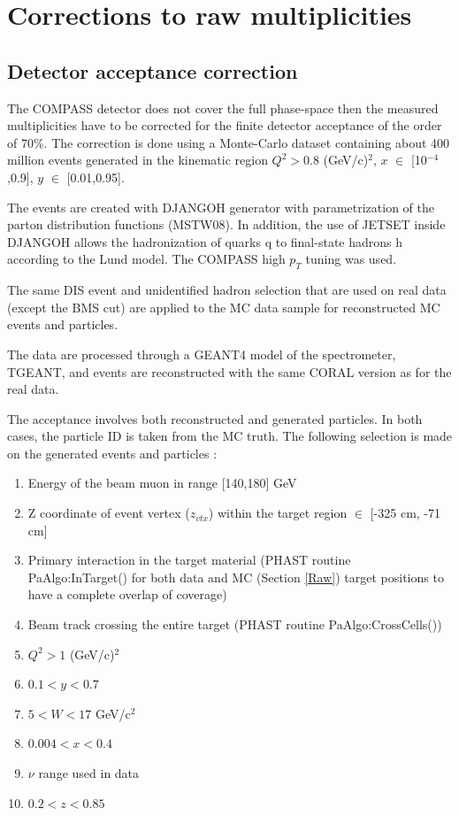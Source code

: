 \documentclass[letterpaper,12pt]{article}
\begin{document}
\section{Corrections to raw multiplicities} \label{Cor}

\subsection{Detector acceptance correction}

The COMPASS detector does not cover the full phase-space then the measured multiplicities have
to be corrected for the finite detector acceptance of the order of 70\%. The correction is
done using a Monte-Carlo dataset containing about 400 million events generated in the kinematic
region $Q^2 > 0.8$ (GeV/c)$^2$, $x$ $\in$ [10$^{-4}$,0.9], $y$ $\in$ [0.01,0.95].

The events are created with DJANGOH generator with parametrization of the parton distribution functions
(MSTW08). In addition, the use of JETSET inside DJANGOH allows the hadronization of quarks q to final-state
hadrons h according to the Lund model. The COMPASS high $p_T$ tuning was used.

The same DIS event and unidentified hadron selection that are used on real data (except the BMS cut) are applied
to the MC data sample for reconstructed MC events and particles.

The data are processed through a GEANT4 model of the spectrometer, TGEANT, and events are reconstructed with the
same CORAL version as for the real data.

The acceptance involves both reconstructed and generated particles. In both cases, the particle ID is taken from
the MC truth. The following selection is made on the generated events and particles :

\begin{enumerate}
  \item Energy of the beam muon in range [140,180] GeV
	\item Z coordinate of event vertex ($z_{vtx}$) within the target region $\in$ [-325 cm, -71 cm]
	\item Primary interaction in the target material (PHAST routine PaAlgo:InTarget() for both data and MC (Section \ref{Raw}) target positions
				to have a complete overlap of coverage)
	\item Beam track crossing the entire target (PHAST routine PaAlgo:CrossCells())
  \item $Q^2>1$ (GeV/c)$^2$
  \item $0.1 < y < 0.7$
	\item $5 < W < 17$ GeV/c$^2$
  \item $0.004 < x < 0.4$
  \item $\nu$ range used in data
  \item $0.2 < z < 0.85$
\end{enumerate}
\end{document}
